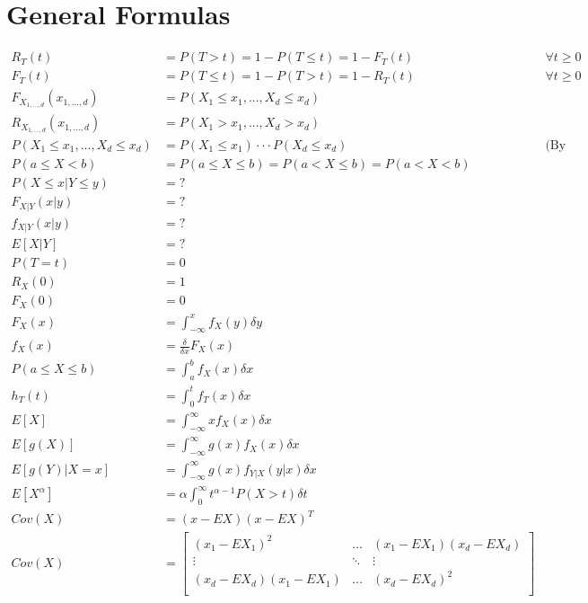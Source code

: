 \documentclass[10pt]{report}
\begin{document}
\section*{General Formulas}
\begin{align*}
R_{T}(t)& = P(T > t) = 1 - P(T \leq t) = 1 - F_{T}(t)& \forall t \geq 0\\
F_{T}(t)& = P(T \leq t) = 1 - P(T > t) = 1 - R_{T}(t)& \forall t \geq 0\\
F_{X_{1, ..., d}}(x_{1, ..., d})& = P(X_{1} \leq x_{1}, ..., X_{d} \leq x_{d})\\
R_{X_{1, ..., d}}(x_{1, ..., d})& = P(X_{1} > x_{1}, ..., X_{d} > x_{d})\\
P(X_{1} \leq x_{1}, ..., X_{d} \leq x_{d})& = P(X_{1} \leq x_{1}) \cdot \cdot \cdot P(X_{d} \leq x_{d})& \text{(By Independence)}\\
P(a \leq X < b)& = P(a \leq X \leq b) = P(a < X \leq b) = P(a < X < b)\\
P(X \leq x | Y \leq y)& = ?\\
F_{X | Y}(x | y)& = ?\\
f_{X | Y}(x | y)& = ?\\
E\left[X | Y\right]& = ?\\
P(T = t)& = 0\\
R_{X}(0)& = 1\\
F_{X}(0)& = 0\\
F_{X}(x)& = \int_{-\infty}^{x}f_{X}(y)\delta y\\
f_{X}(x)& = \frac{\delta}{\delta x}F_{X}(x)\\
P(a \leq X \leq b)& = \int_{a}^{b}f_{X}(x)\delta x\\
h_{T}(t)& = \int_{0}^{t}f_{T}(x)\delta x\\
E\left[X\right]& = \int_{-\infty}^{\infty}xf_{X}(x)\delta x\\
E\left[g(X)\right]& = \int_{-\infty}^{\infty}g(x)f_{X}(x)\delta x\\
E\left[g(Y) | X = x \right]& = \int_{-\infty}^{\infty}g(x)f_{Y | X}(y | x)\delta x\\
E\left[X^{\alpha}\right]& = \alpha \int_{0}^{\infty}t^{\alpha-1}P\left(X > t\right)\delta t\\
Cov(X)& = (x - EX)(x - EX)^{T}\\
Cov(X)& = 
\begin{bmatrix}
(x_{1} - EX_{1})^{2} & \hdots & (x_{1} - EX_{1})(x_{d} - EX_{d})\\
\vdots & \ddots & \vdots\\
(x_{d} - EX_{d})(x_{1} - EX_{1}) & \hdots & (x_{d} - EX_{d})^{2}\\
\end{bmatrix}\\
\end{align*}
\end{document}
